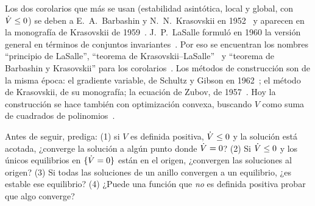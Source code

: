 
\begin{historia}
Los dos corolarios que más se usan (estabilidad asintótica, local y global, con $\dot V\le0$) se deben a E.~A.~Barbashin y N.~N.~Krasovskii en 1952~\citep{BaKr52} y aparecen en la monografía de Krasovskii de 1959~\citep{Kra63}. J.~P.~LaSalle formuló en 1960 la versión general en términos de conjuntos invariantes~\citep{LaS60}. Por eso se encuentran los nombres ``principio de LaSalle'', ``teorema de Krasovskii--LaSalle''~\citep{KeBr23} y ``teorema de Barbashin y Krasovskii'' para los corolarios~\citep{Kha02}. Los métodos de construcción son de la misma época: el gradiente variable, de Schultz y Gibson en 1962~\citep{ScGi62}; el método de Krasovskii, de su monografía; la ecuación de Zubov, de 1957~\citep{Zub64}. Hoy la construcción se hace también con optimización convexa, buscando $V$ como suma de cuadrados de polinomios~\citep{Par00}.
\end{historia}

\begin{pausa}
Antes de seguir, prediga: (1) si $V$ es definida positiva, $\dot V\le0$ y la solución está acotada, ¿converge la solución a algún punto donde $\dot V=0$? (2) Si $\dot V\le0$ y los únicos equilibrios en $\{\dot V=0\}$ están en el origen, ¿convergen las soluciones al origen? (3) Si todas las soluciones de un anillo convergen a un equilibrio, ¿es estable ese equilibrio? (4) ¿Puede una función que \emph{no} es definida positiva probar que algo converge?
\end{pausa}
